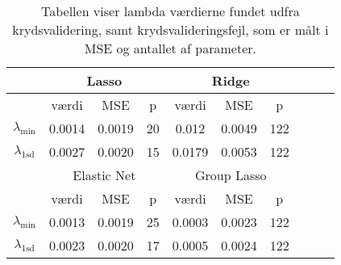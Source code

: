 \begin{table}
\center
\begin{tabular}{cccc | cccccc}
\toprule
 &  \multicolumn{3}{c}{Lasso} &  \multicolumn{3}{c}{Ridge}  \\ \midrule
 & værdi & MSE & p & 	værdi & MSE & p \\
 $\lambda_{\min}$ &0.0014& 0.0019 & 20 	& 0.012 &  0.0049 & 122 \\ 
 $\lambda_{1 \text{sd}}$ &0.0027 & 0.0020 & 15 & 0.0179 & 0.0053 & 122  \\ \bottomrule \toprule
  &  \multicolumn{3}{c}{Elastic Net}  &  \multicolumn{3}{c}{Group Lasso}  \\ \midrule
 & værdi & MSE & p & værdi & MSE & p \\
 $\lambda_{\min}$ & 0.0013 & 0.0019 & 25 & 0.0003 & 0.0023  & 122\\
  $\lambda_{1\text{sd}}$ & 0.0023& 0.0020 & 17 & 0.0005 & 0.0024 & 122 \\ \bottomrule
 \end{tabular}
\caption{Tabellen viser lambda værdierne fundet udfra krydsvalidering, samt krydsvalideringsfejl, som er målt i MSE og antallet af parameter.} \label{tab:cv_tab}
\end{table}
